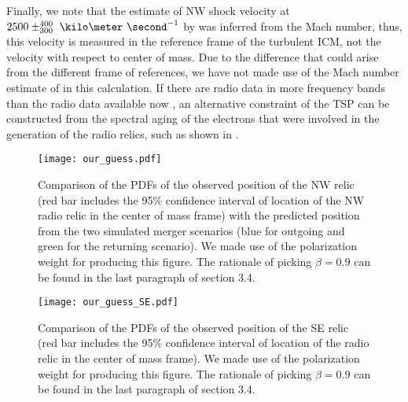\documentclass[ucdthesis.tex]{subfiles}
\begin{document}
    \par 
    Finally, we note that the estimate of NW shock velocity at $2500
    \pm^{400}_{300}~\kilo\meter~\second^{-1}$ by \cite{L13} was inferred from
    the Mach number, thus, this velocity is measured in the reference frame of
    the turbulent ICM, not the velocity with respect to center of
    mass. Due to the difference that could arise from the different frame of
    references, we have not made use of the Mach number estimate of \cite{L13} in this
    calculation. If there are radio data in more frequency bands than
    the radio data available now \citep{L13}, an alternative constraint of the
    TSP can be constructed from the spectral aging of the electrons that were involved in the generation of the
    radio relics, such as shown in \citet{Stroe14}. \par
    \begin{figure}
    	\texttt{[image: our\_guess.pdf]}
    	\caption{Comparison of the PDFs of the observed position of the NW relic (red bar
    		includes the 95\% confidence interval of location of the NW radio relic in the center of mass frame) with the predicted position from the two simulated merger
    		scenarios (blue for outgoing and green for the returning scenario).
    	We made use of the polarization weight for producing this figure.
    	The
    rationale of picking $\beta = 0.9$ can be found in the last paragraph of
    section 3.4.} 
    	\label{fig:our_guessed_scenario}
    \end{figure}
    \begin{figure}
    	\texttt{[image: our\_guess\_SE.pdf]}
    	\caption{Comparison of the PDFs of the observed position of the SE relic (red bar
    	includes the 95\% confidence interval of location of the radio relic in
    the center of mass frame). We made use of the polarization weight for
    producing this figure. The
    rationale of picking $\beta = 0.9$ can be found in the last paragraph of
    section 3.4. 
    }
    	\label{fig:our_guessed_scenario1}
    \end{figure}
\end{document}
